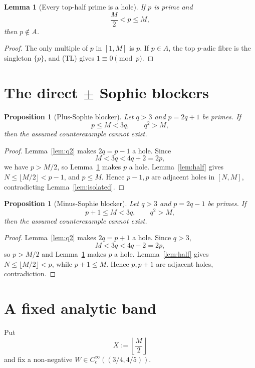 \documentclass[11pt]{article}
\newtheorem{proposition}[theorem]{Proposition}
\newtheorem{lemma}[theorem]{Lemma}
\theoremstyle{definition}
\theoremstyle{remark}
\newcommand{\1}{\mathbf 1}
\begin{document}
\begin{lemma}[Every top-half prime is a hole]\label{lem:tophalf}
If $p$ is prime and
\[
 \frac M2<p\le M,
\]
then $p\notin A$.
\end{lemma}
\begin{proof}
The only multiple of $p$ in $[1,M]$ is $p$.  If $p\in A$, the top $p$-adic fibre is the singleton $\{p\}$,
and (TL) gives $1\equiv0\pmod p$.
\end{proof}

\section{The direct $\pm$ Sophie blockers}

\begin{proposition}[Plus-Sophie blocker]\label{prop:plus}
Let $q>3$ and $p=2q+1$ be primes.  If
\[
 p\le M<3q,
 \qquad q^2>M,
\]
then the assumed counterexample cannot exist.
\end{proposition}
\begin{proof}
Lemma~\ref{lem:q2} makes $2q=p-1$ a hole.  Since
\[
 M<3q<4q+2=2p,
\]
we have $p>M/2$, so Lemma~\ref{lem:tophalf} makes $p$ a hole.  Lemma~\ref{lem:half} gives
$N\le\lfloor M/2\rfloor<p-1$, and $p\le M$.  Hence $p-1,p$ are adjacent holes in $[N,M]$, contradicting
Lemma~\ref{lem:isolated}.
\end{proof}

\begin{proposition}[Minus-Sophie blocker]\label{prop:minus}
Let $q>3$ and $p=2q-1$ be primes.  If
\[
 p+1\le M<3q,
 \qquad q^2>M,
\]
then the assumed counterexample cannot exist.
\end{proposition}
\begin{proof}
Lemma~\ref{lem:q2} makes $2q=p+1$ a hole.  Since $q>3$,
\[
 M<3q<4q-2=2p,
\]
so $p>M/2$ and Lemma~\ref{lem:tophalf} makes $p$ a hole.  Lemma~\ref{lem:half} gives
$N\le\lfloor M/2\rfloor<p$, while $p+1\le M$.  Hence $p,p+1$ are adjacent holes, contradiction.
\end{proof}

\section{A fixed analytic band}

Put
\[
 X:=\left\lfloor\frac M2\right\rfloor
\]
and fix a non-negative $W\in C_c^\infty((3/4,4/5))$.
\end{document}
